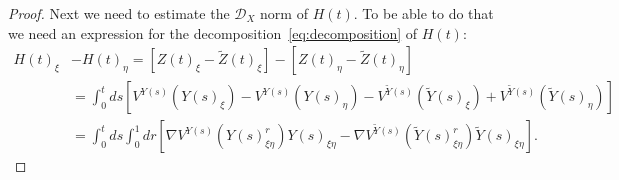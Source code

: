 \documentclass[a4paper,12pt,reqno]{amsart}
\newcommand{\wt}{\widetilde}
\newcommand{\DX}{\mathscr{D}_{X}}
\begin{document}
\begin{proof}
Next we need to estimate the $\DX$ norm of $H(t)$. To be able to do that we need an expression for the decomposition~\ref{eq:decomposition} of $H(t)$: 
\begin{equation*}
  \begin{split}
 H(t)_\xi & - H(t)_\eta  =    [Z(t)_\xi -\wt Z(t)_\xi]-[ Z(t)_\eta-\wt Z(t)_\eta]
\\ &= \int_0^t ds \left[
V^{Y(s)}(Y(s)_\xi) - V^{Y(s)}(Y(s)_\eta) - V^{\wt Y(s)}(\wt Y(s)_\xi)
+ V^{\wt Y(s)}(\wt Y(s)_\eta)\right]
\\ & = \int_0^t ds \int_0^1 dr \left[
 \nabla V^{Y(s)}(Y(s)_{\xi\eta}^r) Y(s)_{\xi\eta} - \nabla V^{\wt Y(s)}(\wt
 Y(s)_{\xi\eta}^r) \wt Y(s)_{\xi\eta}
\right].
  \end{split}
\end{equation*}
%

\end{proof}
\end{document}
